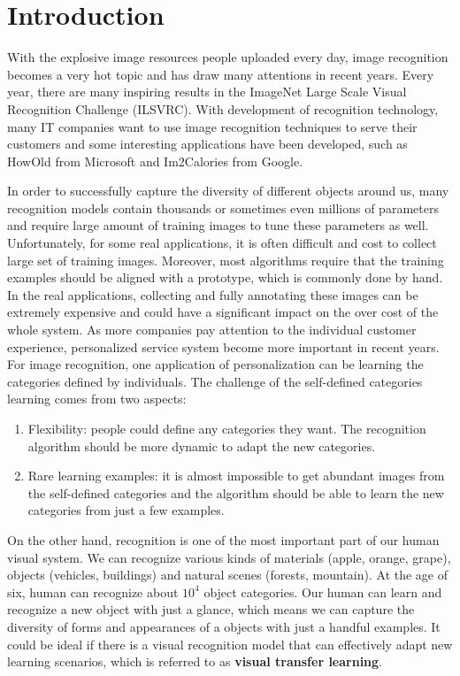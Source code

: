 \chapter{Introduction}\label{sec:intro}
With the explosive image resources people uploaded every day, image recognition becomes a very hot topic and has draw many attentions in recent years. Every year, there are many inspiring results in the ImageNet Large Scale Visual Recognition Challenge (ILSVRC). 
With development of recognition technology, many IT companies want to use image recognition techniques to serve their customers and some interesting applications have been developed, such as HowOld from Microsoft and Im2Calories from Google.

In order to successfully capture the diversity of different objects around us, many recognition models contain thousands or sometimes even millions of parameters and require large amount of training images to tune these parameters as well.
Unfortunately, for some real applications, it is often difficult and cost to collect large set of training images. Moreover, most algorithms require that the training examples should be aligned with a prototype, which is commonly done by hand. In the real applications, collecting and fully annotating these images can be extremely expensive and could have a significant impact on the over cost of the whole system. As more companies pay attention to the individual customer experience, personalized service system become more important in recent years. For image recognition, one application of personalization can be learning the categories defined by individuals. The challenge of the self-defined categories learning comes from two aspects:
\begin{enumerate}
	\item Flexibility: people could define any categories they want. The recognition algorithm should be more dynamic to adapt the new categories.
	\item Rare learning examples: it is almost impossible to get abundant images from the self-defined categories and the algorithm should be able to learn the new categories from just a few examples.
\end{enumerate} 

On the other hand, recognition is one of the most important part of our human visual system. We can recognize various kinds of materials (apple, orange, grape), objects (vehicles, buildings) and natural scenes (forests, mountain). At the age of six, human can recognize about $10^4$ object categories\cite{biederman1987recognition}. 
Our human can learn and recognize a new object with just a glance, which means we can capture the diversity of forms and appearances of a objects with just a handful examples. It could be ideal if there is a visual recognition model that can effectively adapt new learning scenarios, which is referred to as \textbf{visual transfer learning}. 

